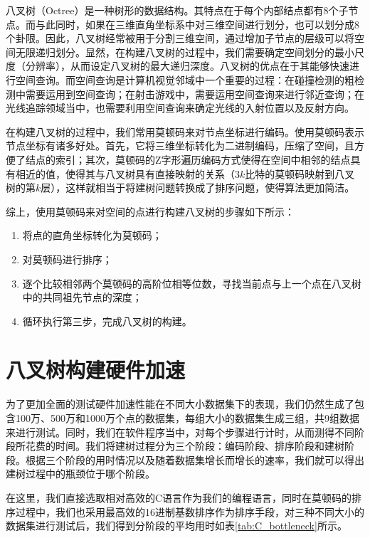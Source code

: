 八叉树（Octree）是一种树形的数据结构。其特点在于每个内部结点都有8个子节点。而与此同时，如果在三维直角坐标系中对三维空间进行划分，也可以划分成8个卦限。因此，八叉树经常被用于分割三维空间，通过增加子节点的层级可以将空间无限递归划分\cite{meagher1980octree}。显然，在构建八叉树的过程中，我们需要确定空间划分的最小尺度（分辨率），从而设定八叉树的最大递归深度。八叉树的优点在于其能够快速进行空间查询。而空间查询是计算机视觉邻域中一个重要的过程：在碰撞检测的粗检测中需要运用到空间查询；在射击游戏中，需要运用空间查询来进行邻近查询；在光线追踪领域当中，也需要利用空间查询来确定光线的入射位置以及反射方向。

在构建八叉树的过程中，我们常用莫顿码\cite{morton1966computer}来对节点坐标进行编码。使用莫顿码表示节点坐标有诸多好处。首先，它将三维坐标转化为二进制编码，压缩了空间，且方便了结点的索引；其次，莫顿码的Z字形遍历编码方式使得在空间中相邻的结点具有相近的值，使得其与八叉树具有直接映射的关系（$3k$比特的莫顿码映射到八叉树的第$k$层\cite{karras2012maximizing}），这样就相当于将建树问题转换成了排序问题，使得算法更加简洁。

综上，使用莫顿码来对空间的点进行构建八叉树的步骤如下所示：
\begin{enumerate}
    \item 将点的直角坐标转化为莫顿码；
    \item 对莫顿码进行排序；
    \item 逐个比较相邻两个莫顿码的高阶位相等位数，寻找当前点与上一个点在八叉树中的共同祖先节点的深度；
    \item 循环执行第三步，完成八叉树的构建。
\end{enumerate}



\section{八叉树构建硬件加速}

为了更加全面的测试硬件加速性能在不同大小数据集下的表现，我们仍然生成了包含100万、500万和1000万个点的数据集，每组大小的数据集生成三组，共9组数据来进行测试。同时，我们在软件程序当中，对每个步骤进行计时，从而测得不同阶段所花费的时间。我们将建树过程分为三个阶段：编码阶段、排序阶段和建树阶段。根据三个阶段的用时情况以及随着数据集增长而增长的速率，我们就可以得出建树过程中的瓶颈位于哪个阶段。

在这里，我们直接选取相对高效的C语言作为我们的编程语言，同时在莫顿码的排序过程中，我们也采用最高效的16进制基数排序作为排序手段，对三种不同大小的数据集进行测试后，我们得到分阶段的平均用时如表\ref{tab:C_bottleneck}所示。

